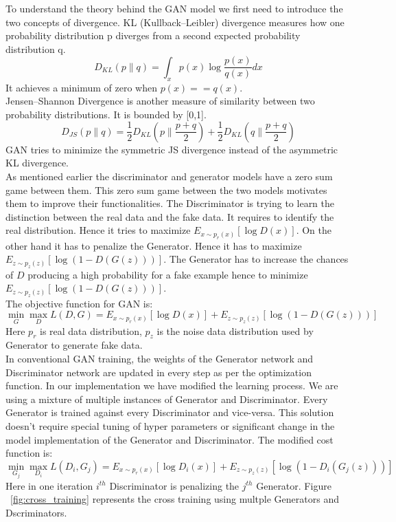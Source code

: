 \documentclass[12pt]{article}
\begin{document}
To understand the theory behind the GAN model we first need to introduce the two concepts of divergence. KL (Kullback–Leibler) divergence measures how one probability distribution p diverges from a second expected probability distribution q.
$$D_{KL}(p \lVert q) = \int_{x} p(x) \log \frac{p(x)}{q(x)}dx$$
It achieves a minimum of zero when $p(x) == q(x)$.\\ Jensen–Shannon Divergence is another measure of similarity between two probability distributions. It is bounded by [0,1].
$$D_{JS}(p \lVert q) = \frac{1}{2}D_{KL}(p \lVert \frac{p+q}{2}) + \frac{1}{2}D_{KL}(q \lVert \frac{p+q}{2})$$
GAN tries to minimize the symmetric JS divergence instead of the asymmetric KL divergence.\\

As mentioned earlier the discriminator and generator models have a zero sum game between them. This zero sum game between the two models motivates them to improve their functionalities. The Discriminator is trying to learn the distinction between the real data and the fake data. It requires to identify the real distribution. Hence it tries to maximize $E_{x \sim p_r(x)}[\log D(x)]$. On the other hand it has to penalize the Generator. Hence it has to maximize $E_{z \sim p_z(z)}[\log (1- D(G(z)))]$. The Generator has to increase the chances of $D$ producing a high probability for a fake example hence to minimize $E_{z \sim p_z(z)}[\log(1 - D(G(z)))]$.\\
The objective function for GAN is:
$$\min_{G} \max_{D} L(D,G) = E_{x \sim p_r(x)}[\log D(x)] + E_{z \sim p_z(z)}[\log (1-D(G(z)))]$$
Here $p_r$ is real data distribution, $p_z$ is the noise data distribution used by Generator to generate fake data.\\

In conventional GAN training, the weights of the Generator network and Discriminator network are updated in every step as per the optimization function. In our implementation we have modified the learning process. We are using a mixture of multiple instances of Generator and Discriminator. Every Generator is trained against every Discriminator and vice-versa. This solution doesn't require special tuning of hyper parameters or significant change in the model implementation of the Generator and Discriminator. The modified cost function is:
$$\min_{G_j} \max_{D_i} L(D_i,G_j) = E_{x \sim p_r(x)}[\log D_i(x)] + E_{z \sim p_z(z)}[\log (1-D_i(G_j(z)))]$$
Here in one iteration $i^{th}$ Discriminator is penalizing  the $j^{th}$ Generator. Figure ~\ref{fig:cross_training} represents the cross training using multple Generators and Dscriminators.\\
\end{document}
